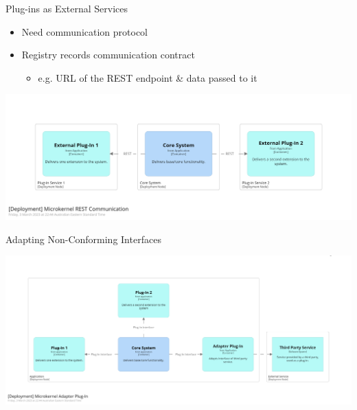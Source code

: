 \documentclass{slide}
\begin{document}
\begin{frame}{Plug-ins as External Services}
    \begin{itemize}
        \LARGE\item Need communication protocol
        \LARGE\item Registry records communication contract
        \begin{itemize}
            \Large\item e.g. URL of the REST endpoint \& data passed to it
        \end{itemize}
    \end{itemize}
    \vspace{8mm}
    \includegraphics[trim=197 197 197 195,clip,width=\textwidth]{../../notes/microkernel/diagrams/rest-microkernel.png}
\end{frame}

\begin{frame}{Adapting Non-Conforming Interfaces}
    \begin{adjustwidth}{-7.5mm}{-7.5mm}
        \includegraphics[trim=195 197 195 195,clip,width=0.97\paperwidth]{../../notes/microkernel/diagrams/adapter-plug-in.png}
    \end{adjustwidth}
\end{frame}
\end{document}
